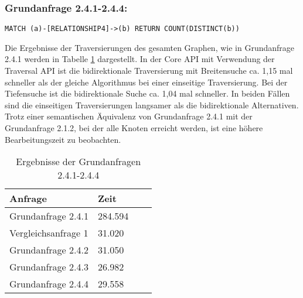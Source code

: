 \subsubsection{Grundanfrage 2.4.1-2.4.4:}
 \begin{Verbatim}[frame=single]
MATCH (a)-[RELATIONSHIP4]->(b) RETURN COUNT(DISTINCT(b))
\end{Verbatim}
Die Ergebnisse der Traversierungen des gesamten Graphen, wie in Grundanfrage 2.4.1 werden in Tabelle \ref{tab:Query2_4} dargestellt.
 In der Core API mit Verwendung der Traversal API ist die bidirektionale Traversierung mit Breitensuche ca. 1,15 mal schneller als der gleiche Algorithmus bei einer einseitige Traversierung. Bei der Tiefensuche ist die bidirektionale Suche ca. 1,04 mal schneller. In beiden Fällen sind die einseitigen Traversierungen langsamer als die bidirektionale Alternativen. \newline
Trotz einer semantischen Äquivalenz von Grundanfrage 2.4.1 mit der Grundanfrage 2.1.2, bei der alle Knoten erreicht werden, ist eine höhere Bearbeitungszeit zu beobachten. 
\FloatBarrier
\begin{table}[!htb]
	\centering
	\begin{tabular}{ |p{5cm}||p{3cm}|p{3cm}|p{3cm}|  }
		\hline
		Anfrage & Zeit\\
		\hline
		Grundanfrage 2.4.1 & 284.594\\
		\hline
		Vergleichsanfrage 1 & 31.020  \\
		\hline
		Grundanfrage 2.4.2 & 31.050\\
		\hline
		Grundanfrage 2.4.3 &   26.982 \\
		\hline
		Grundanfrage 2.4.4 &  29.558\\
		\hline
	\end{tabular}
	\caption{Ergebnisse der Grundanfragen 2.4.1-2.4.4}
	\label{tab:Query2_4}
\end{table}
\FloatBarrier

